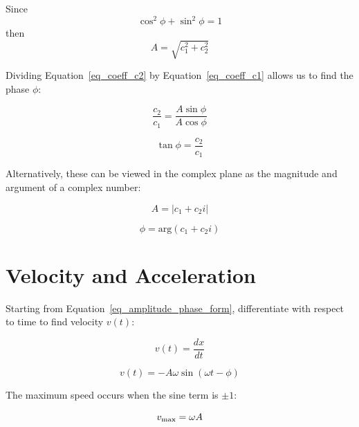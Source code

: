 \documentclass{article}
\begin{document}
Since 
\begin{equation}
\cos^2 \phi + \sin^2 \phi = 1
\label{euler_eq}
\end{equation}
then
\begin{equation}
A = \sqrt{c_1^2 + c_2^2}
\label{eq_amplitude_def}
\end{equation}

Dividing Equation~\ref{eq_coeff_c2} by Equation~\ref{eq_coeff_c1} allows us to find the phase $\phi$:

\begin{equation}
\frac{c_2}{c_1} = \frac{A \sin \phi}{A \cos \phi}
\label{eq_tangent_ratio}
\end{equation}

\begin{equation}
\tan \phi = \frac{c_2}{c_1}
\label{eq_phase_def}
\end{equation}

Alternatively, these can be viewed in the complex plane as the magnitude and argument of a complex number:

\begin{equation}
A = |c_1 + c_2 i|
\label{eq_complex_magnitude}
\end{equation}

\begin{equation}
\phi = \text{arg}(c_1 + c_2 i)
\label{eq_complex_argument}
\end{equation}

\section{Velocity and Acceleration}

Starting from Equation~\ref{eq_amplitude_phase_form}, differentiate with respect to time to find velocity $v(t)$:

\begin{equation}
v(t) = \frac{dx}{dt}
\label{eq_v_derivative_op}
\end{equation}

\begin{equation}
v(t) = -A \omega \sin(\omega t - \phi)
\label{eq_velocity_time_form}
\end{equation}

The maximum speed occurs when the sine term is $\pm 1$:

\begin{equation}
v_{\rm max} = \omega A
\label{eq_v_max}
\end{equation}
\end{document}
